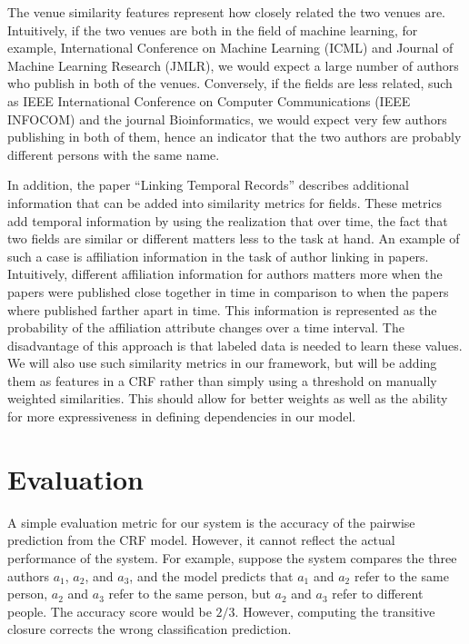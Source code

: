 \documentclass[twocolumn,letterpaper]{article}
\begin{document}
The venue similarity features represent how closely related the two venues are.  Intuitively, if the two venues are both in the field of machine learning, for example, International Conference on Machine Learning (ICML) and Journal of Machine Learning Research (JMLR), we would expect a large number of authors who publish in both of the venues.  Conversely, if the fields are less related, such as IEEE International Conference on Computer Communications (IEEE INFOCOM) and the journal Bioinformatics, we would expect very few authors publishing in both of them, hence an indicator that the two authors are probably different persons with the same name.

In addition, the paper ``Linking Temporal Records'' \cite{DBLP:journals/fcsc/LiDMS12} describes additional information that can be added into similarity metrics for fields. These metrics add temporal information by using the realization that over time, the fact that two fields are similar or different matters less to the task at hand. An example of such a case is affiliation information in the task of author linking in papers. Intuitively, different affiliation information for authors matters more when the papers were published close together in time in comparison to when the papers where published farther apart in time. This information is represented as the probability of the affiliation attribute changes over a time interval. The disadvantage of this approach is that labeled data is needed to learn these values.  We will also use such similarity metrics in our framework, but will be adding them as features in a CRF rather than simply using a threshold on manually weighted similarities. This should allow for better weights as well as the ability for more expressiveness in defining dependencies in our model.

\section{Evaluation} %
\label{sec:evaluation}
A simple evaluation metric for our system is the accuracy
of the pairwise prediction from the CRF model.  However, it cannot
reflect the actual performance of the system.  For example, suppose
the system compares the three authors $a_1$, $a_2$, and $a_3$, and the
model predicts that $a_1$ and $a_2$ refer to the same person, $a_2$
and $a_3$ refer to the same person, but $a_2$ and $a_3$ refer to
different people.  The accuracy score would be $2/3$.  However,
computing the transitive closure corrects the wrong classification
prediction.
\end{document}
